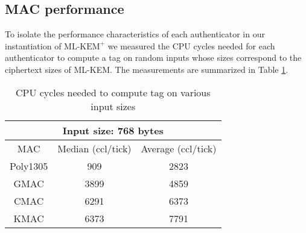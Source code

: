 \documentclass[journal=tches,submission]{iacrtrans}
\def\mlkemplus{\text{ML-KEM}^+}
\begin{document}
\subsection{MAC performance}
To isolate the performance characteristics of each authenticator in our instantiation of $\mlkemplus$ we measured the CPU cycles needed for each authenticator to compute a tag on random inputs whose sizes correspond to the ciphertext sizes of ML-KEM. The measurements are summarized in Table \ref{tbl:mac-performance}.

\begin{table}[h]
    \centering
    \small
    \caption{CPU cycles needed to compute tag on various input sizes}\label{tbl:mac-performance}
    \begin{tabular}{|c|c|c|}
        \hline
        \multicolumn{3}{|c|}{\bf Input size: 768 bytes} \\
        \hline
        MAC & Median (ccl/tick) & Average (ccl/tick)\\
        \hline
        Poly1305 & 909 & 2823 \\
        \hline
        GMAC & 3899 & 4859 \\
        \hline
        CMAC & 6291 & 6373 \\
        \hline
        KMAC & 6373 & 7791 \\
        \hline
    \end{tabular}
\end{table}
\end{document}
